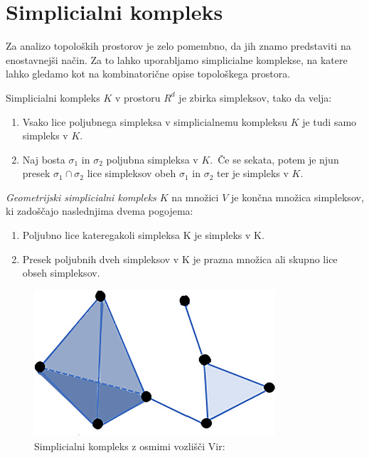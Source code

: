 \section{Simplicialni kompleks}
Za analizo topoloških prostorov je zelo pomembno, da jih znamo predstaviti na enostavnejši način. Za to lahko uporabljamo simplicialne komplekse, na katere lahko gledamo kot na kombinatorične opise topološkega prostora.

\begin{definicija}
  Simplicialni kompleks \(K\) v prostoru \(R^d\) je zbirka simpleksov, tako da velja:
  \begin{enumerate}
    \item Vsako lice poljubnega simpleksa v simplicialnemu kompleksu \(K\) je tudi samo simpleks v \(K\).
    \item Naj bosta \(\sigma_1\) in \(\sigma_2\) poljubna simpleksa v \(K\).\ \v{C}e se sekata, potem je njun presek \(\sigma_1 \cap \sigma_2\) lice simpleksov obeh \(\sigma_1\) in \(\sigma_2\) ter je simpleks v \(K\).
  \end{enumerate}
\end{definicija}

\begin{definicija}
  \textit{Geometrijski simplicialni kompleks $K$} na množici $V$ je končna množica simpleksov, ki zadoščajo naslednjima dvema pogojema:
  \begin{enumerate}
    \item Poljubno lice kateregakoli simpleksa K je simpleks v K.
    \item Presek poljubnih dveh simpleksov v K je prazna množica ali skupno lice obseh simpleksov.
  \end{enumerate}
\end{definicija}

\begin{figure}[H]
  \centering
  \includegraphics[width=0.8\textwidth]{resources/Simplicial-complex-eight-vertices.png}
  \caption{Simplicialni kompleks z osmimi vozlišči Vir:~\cite{researchgate_simplicial_complex}}\label{fig:your-label3}
\end{figure}

